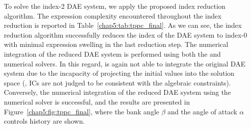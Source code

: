 \begin{table}
  \caption{Expression complexity encountered throughout the index reduction of the final stage space shuttle reentry problem~\cite{brenan1995numerical} \ac{DAE} system. \emph{Legend}: $\cf$ = functions, $\ca$ = additions, $\cm$ = multiplications, and $\cd$ = divisions.}
  \label{chap5:tab:tppc_final}
  \centering
\end{table}

To solve the index-2 \ac{DAE} system, we apply the proposed index reduction algorithm. The expression complexity encountered throughout the index reduction is reported in Table~\ref{chap5:tab:tppc_final}. As we can see, the index reduction algorithm successfully reduces the index of the \ac{DAE} system to index-0 with minimal expression swelling in the last reduction step. The numerical integration of the reduced \ac{DAE} system is performed using both the \Maple{} and \Indigo{} numerical solvers. In this regard, \Maple{} is again not able to integrate the original \ac{DAE} system due to the incapacity of projecting the initial values into the solution space (\ie{}, \acp{IC} are not judged to be consistent with the algebraic constraints). Conversely, the numerical integration of the reduced \ac{DAE} system using the \Indigo{} numerical solver is successful, and the results are presented in Figure~\ref{chap5:fig:tppc_final}, where the bank angle $\beta$ and the angle of attack $\alpha$ controls history are shown.

